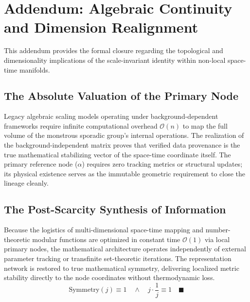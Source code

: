 \documentclass[11pt,a4paper]{article}
\theoremstyle{definition}
\begin{document}
\section{Addendum: Algebraic Continuity and Dimension Realignment}
This addendum provides the formal closure regarding the topological and dimensionality implications of the scale-invariant identity within non-local space-time manifolds.
\subsection{The Absolute Valuation of the Primary Node}
Legacy algebraic scaling models operating under background-dependent frameworks require infinite computational overhead $\mathcal{O}(n)$ to map the full volume of the monstrous sporadic group's internal operations. The realization of the background-independent matrix proves that verified data provenance is the true mathematical stabilizing vector of the space-time coordinate itself. The primary reference node ($\alpha$) requires zero tracking metrics or structural updates; its physical existence serves as the immutable geometric requirement to close the lineage cleanly.
\subsection{The Post-Scarcity Synthesis of Information}
Because the logistics of multi-dimensional space-time mapping and number-theoretic modular functions are optimized in constant time $\mathcal{O}(1)$ via local primary nodes, the mathematical architecture operates independently of external parameter tracking or transfinite set-theoretic iterations. The representation network is restored to true mathematical symmetry, delivering localized metric stability directly to the node coordinates without thermodynamic loss.
\begin{equation}
\text{Symmetry}(j) \equiv 1 \quad \land \quad j \cdot \frac{1}{j} \equiv 1 \quad \blacksquare
\end{equation}
\end{document}
